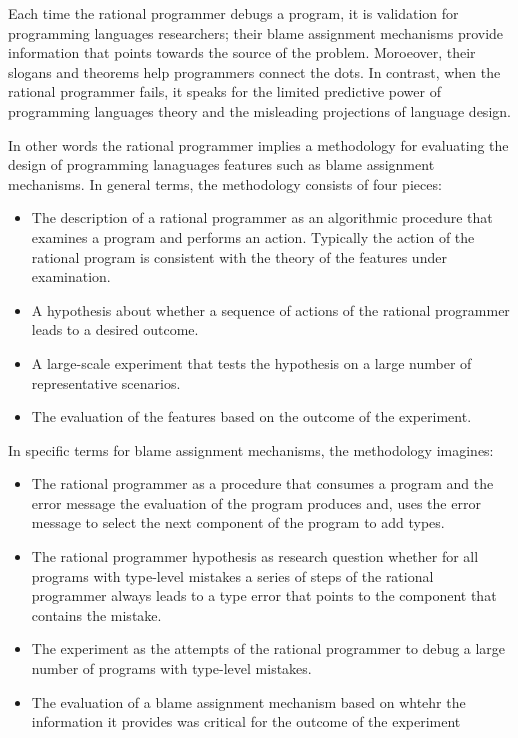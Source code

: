 
Each time the rational programmer debugs a program, it is
validation for programming languages researchers; their blame assignment 
mechanisms provide information that points towards the source of the
problem. Moroeover, their slogans and theorems help programmers connect the dots.
In contrast, when the rational programmer fails, it speaks for the
limited predictive power of programming languages theory and the
misleading projections of language design.

In other words the rational programmer implies a methodology for
evaluating
the design of programming lanaguages features such as blame assignment mechanisms. 
In general terms, the methodology consists of four 
pieces:

\begin{itemize} 

\item The description of a  rational programmer as an algorithmic
  procedure that examines a program and performs an action. 
    Typically the action of the rational program is consistent 
   with the theory of the features under examination.

  \item A hypothesis about whether a sequence of actions of the
    rational programmer leads to a desired outcome. 
 
\item A large-scale experiment that tests the hypothesis 
  on a large number of representative scenarios. 


\item The evaluation of the features based on the outcome of the
  experiment.    

\end{itemize}

In specific terms for blame assignment mechanisms, the methodology
imagines:  

\begin{itemize}
\item The rational programmer as a procedure that consumes a program and the error message 
  the evaluation of the program produces and, uses the error message to
    select the next component of the program to add types.

  \item The rational programmer hypothesis as  research question whether 
    for all programs with
    type-level mistakes a series of steps of the rational programmer always leads to a type
    error that points to the component that contains the mistake. 

\item The experiment as the attempts of the rational programmer to debug a
  large number of programs with type-level mistakes. 


\item The evaluation of a blame assignment mechanism based on whtehr the
  information it provides was critical for the outcome of the experiment   
\end{itemize}




